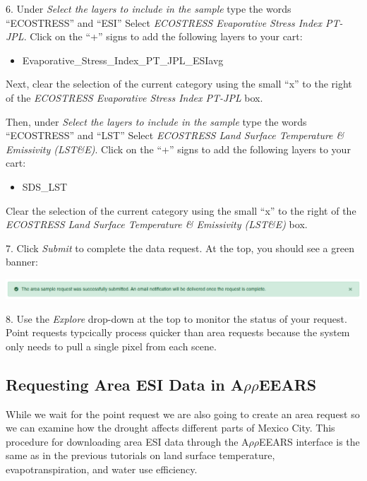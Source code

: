 \documentclass[oneside,a4paper,11pt,explicit]{book}
\begin{document}
\vspace{.5em}

6. Under \textit{Select the layers to include in the sample} type the words ``ECOSTRESS'' and ``ESI'' Select \textit{ECOSTRESS Evaporative Stress Index PT-JPL}. Click on the ``+'' signs to add the following layers to your cart: 

\begin{itemize}
	\item Evaporative\_Stress\_Index\_PT\_JPL\_ESIavg
\end{itemize}

Next, clear the selection of the current category using the small ``x'' to the right of the \textit{ECOSTRESS Evaporative Stress Index PT-JPL} box.

Then, under \textit{Select the layers to include in the sample} type the words ``ECOSTRESS'' and ``LST'' Select \textit{ECOSTRESS Land Surface Temperature \& Emissivity (LST\&E)}. Click on the ``+'' signs to add the following layers to your cart: 

\begin{itemize}
	\item SDS\_LST
\end{itemize}

Clear the selection of the current category using the small ``x'' to the right of the \textit{ECOSTRESS Land Surface Temperature \& Emissivity (LST\&E)} box.

7. Click \textit{Submit} to complete the data request. At the top, you should see a green banner:

\vspace{.5em}

\centerline{\includegraphics[width=\textwidth]{RequestSuccess.png}}

8. Use the \textit{Explore} drop-down at the top to monitor the status of your request. Point requests typcically process quicker than area requests because the system only needs to pull a single pixel from each scene.

\subsection{Requesting Area ESI Data in A$\rho\rho$EEARS}

While we wait for the point request we are also going to create an area request so we can examine how the drought affects different parts of Mexico City. This procedure for downloading area ESI data through the A$\rho\rho$EEARS interface is the same as in the previous tutorials on land surface temperature, evapotranspiration, and water use efficiency.
\end{document}
